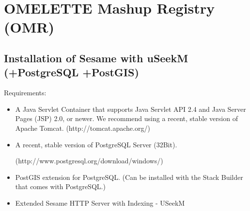 \chapter{OMELETTE Mashup Registry (OMR)}

\section{Installation of Sesame with uSeekM (+PostgreSQL +PostGIS)}

Requirements:

\begin{itemize}

\item A Java Servlet Container that supports Java Servlet API 2.4 and Java Server Pages
(JSP) 2.0, or newer. We recommend using a recent, stable version of Apache Tomcat.
(http://tomcat.apache.org/)
\item A recent, stable version of PostgreSQL Server (32Bit).

(http://www.postgresql.org/download/windows/)
\item PostGIS extension for PostgreSQL. (Can be installed with the Stack Builder that
   comes with PostgreSQL.)
\item Extended Sesame HTTP Server with Indexing - USeekM


\end{itemize}
